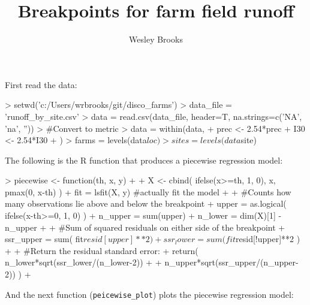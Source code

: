 \documentclass[12pt]{article}
\title{Breakpoints for farm field runoff}
\author{Wesley Brooks}
\date{}                                           %
\begin{document}
\maketitle

First read the data:
\vspace{3mm}

\begin{Schunk}
\begin{Sinput}
> setwd('c:/Users/wrbrooks/git/disco_farms')
> data_file = 'runoff_by_site.csv'
> data = read.csv(data_file, header=T, na.strings=c('NA', 'na', ''))
> #Convert to metric
> data = within(data, {
+     prec <- 2.54*prec
+     I30 <- 2.54*I30
+     })
> farms = levels(data$loc)
> sites = levels(data$site)
\end{Sinput}
\end{Schunk}

\vspace{5mm}

The following is the R function that produces a piecewise regression model:

\begin{Schunk}
\begin{Sinput}
> piecewise <- function(th, x, y)
+ { 
+     X <- cbind( ifelse(x>=th, 1, 0), x, pmax(0, x-th) )
+     fit = lsfit(X, y) #actually fit the model
+     
+     #Counts how many observations lie above and below the breakpoint
+     upper = as.logical( ifelse(x-th>=0, 1, 0) )
+     n_upper = sum(upper)
+     n_lower = dim(X)[1] - n_upper
+     
+     #Sum of squared residuals on either side of the breakpoint
+     ssr_upper = sum( fit$resid[upper]**2 )
+     ssr_lower = sum( fit$resid[!upper]**2 )
+     
+     #Return the residual standard error:
+     return( n_lower*sqrt(ssr_lower/(n_lower-2)) 
+         + n_upper*sqrt(ssr_upper/(n_upper-2)) )
+ }
\end{Sinput}
\end{Schunk}

\newpage

And the next function (\verb+peicewise_plot+) plots the piecewise regression model:
\end{document}
